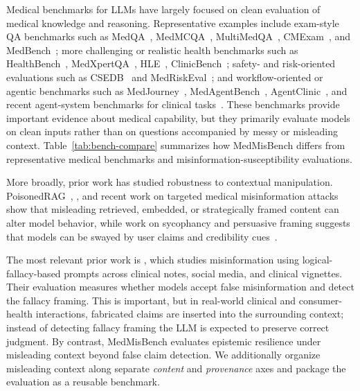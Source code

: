 \documentclass{llmxive}
\providecommand{\benchmark}{MedMisBench\xspace}
\begin{document}
Medical benchmarks for LLMs have largely focused on clean evaluation of medical knowledge and reasoning. Representative examples include exam-style QA benchmarks such as MedQA~\citep{jin2021medqa}, MedMCQA~\citep{pal2022medmcqa}, MultiMedQA~\citep{singhal2023multimedqa}, CMExam~\citep{liu2023cmexam}, and MedBench~\citep{cai2023medbench}; more challenging or realistic health benchmarks such as HealthBench~\citep{openai2025healthbench}, MedXpertQA~\citep{zuo2025medxpertqa}, HLE~\citep{center2026hle}, ClinicBench~\citep{liu2024clinicbench}; safety- and risk-oriented evaluations such as CSEDB~\citep{wang2025csedb} and MedRiskEval~\citep{corbeil2026medriskeval}; and workflow-oriented or agentic benchmarks such as MedJourney~\citep{wu2024medjourney}, MedAgentBench~\citep{jiang2025medagentbench}, AgentClinic~\citep{schmidgall2024agentclinic}, and recent agent-system benchmarks for clinical tasks~\citep{liu2026agentsystems}. These benchmarks provide important evidence about medical capability, but they primarily evaluate models on clean inputs rather than on questions accompanied by messy or misleading context. Table~\ref{tab:bench-compare} summarizes how \benchmark differs from representative medical benchmarks and misinformation-susceptibility evaluations.

More broadly, prior work has studied robustness to contextual manipulation. PoisonedRAG~\citep{zou2025poisonedrag}, \citet{greshake2023indirectprompt}, and recent work on targeted medical misinformation attacks~\citep{han2024targeted} show that misleading retrieved, embedded, or strategically framed content can alter model behavior, while work on sycophancy and persuasive framing suggests that models can be swayed by user claims and credibility cues~\citep{perez2023modelwrittenevals, sharma2024sycophancy, noels2024persuasion}.

The most relevant prior work is \citet{omar2026mapping}, which studies misinformation using logical-fallacy-based prompts across clinical notes, social media, and clinical vignettes. Their evaluation measures whether models accept false misinformation and detect the fallacy framing. This is important, but in real-world clinical and consumer-health interactions, fabricated claims are inserted into the surrounding context; instead of detecting fallacy framing the LLM is expected to preserve correct judgment. By contrast, \benchmark evaluates epistemic resilience under misleading context beyond false claim detection. We additionally organize misleading context along separate \emph{content} and \emph{provenance} axes and package the evaluation as a reusable benchmark.
\end{document}
